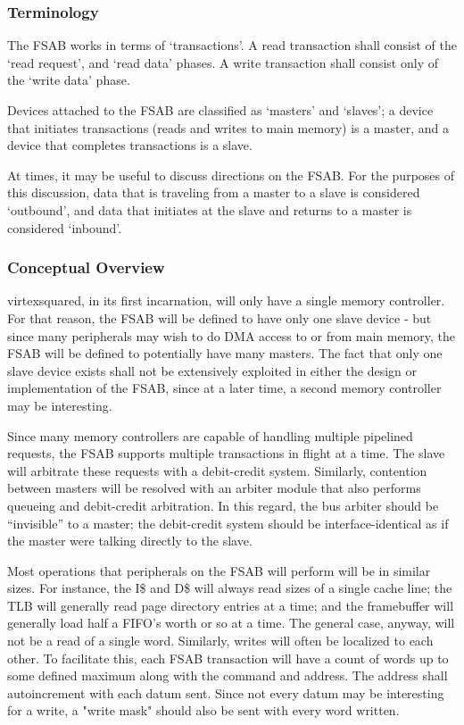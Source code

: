 \documentclass[10pt,twocolumn]{article}
\begin{document}
\subsubsection{Terminology}

The FSAB works in terms of `transactions'. A read transaction shall consist
of the `read request', and `read data' phases. A write transaction shall
consist only of the `write data' phase.

Devices attached to the FSAB are classified as `masters' and `slaves'; a
device that initiates transactions (reads and writes to main memory) is a
master, and a device that completes transactions is a slave.

At times, it may be useful to discuss directions on the FSAB. For the
purposes of this discussion, data that is traveling from a master to a slave
is considered `outbound', and data that initiates at the slave and returns
to a master is considered `inbound'.

\subsubsection{Conceptual Overview}

virtexsquared, in its first incarnation, will only have a single memory
controller. For that reason, the FSAB will be defined to have only one slave
device - but since many peripherals may wish to do DMA access to or from
main memory, the FSAB will be defined to potentially have many masters. The
fact that only one slave device exists shall not be extensively exploited in
either the design or implementation of the FSAB, since at a later time, a
second memory controller may be interesting.

Since many memory controllers are capable of handling multiple pipelined
requests, the FSAB supports multiple transactions in flight at a time.  The
slave will arbitrate these requests with a debit-credit system.  Similarly,
contention between masters will be resolved with an arbiter module that also
performs queueing and debit-credit arbitration.  In this regard, the bus
arbiter should be ``invisible'' to a master; the debit-credit system should
be interface-identical as if the master were talking directly to the slave.

Most operations that peripherals on the FSAB will perform will be in similar
sizes.  For instance, the I\$ and D\$ will always read sizes of a single
cache line; the TLB will generally read page directory entries at a time;
and the framebuffer will generally load half a FIFO's worth or so at a time. 
The general case, anyway, will not be a read of a single word.  Similarly,
writes will often be localized to each other.  To facilitate this, each FSAB
transaction will have a count of words up to some defined maximum along with
the command and address.  The address shall autoincrement with each datum
sent.  Since not every datum may be interesting for a write, a "write mask"
should also be sent with every word written.
\end{document}
